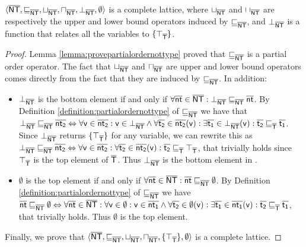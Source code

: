 \documentclass{llncs}
\begin{document}
\begin{lemma}
\label{lemma:nottype}
$\langle \mathsf{\overline{NT}}, \sqsubseteq_{\mathsf{\overline{NT}}}, \sqcup_{\mathsf{\overline{NT}}}, \sqcap_{\mathsf{\overline{NT}}}, \bot_{\mathsf{\overline{NT}}}, \emptyset \rangle$ is a complete lattice, where $\sqcup_{\mathsf{\overline{NT}}}$ and $\sqcap_{\mathsf{\overline{NT}}}$ are respectively the upper and lower bound operators induced by $\sqsubseteq_{\mathsf{\overline{NT}}}$, and $\bot_{\mathsf{\overline{NT}}}$ is a function that relates all the variables to $\{\top_{\mathsf{\overline{T}}}\}$. 

\begin{proof}
Lemma \ref{lemma:provepartialordernottype} proved that $\sqsubseteq_{\mathsf{\overline{NT}}}$ is a partial order operator. The fact that $\sqcup_{\mathsf{\overline{NT}}}$ and $\sqcap_{\mathsf{\overline{NT}}}$ are upper and lower bound operators comes directly from the fact that they are induced by $\sqsubseteq_{\mathsf{\overline{NT}}}$. In addition:
\begin{itemize}
\item $\bot_{\mathsf{\overline{NT}}}$ is the bottom element if and only if $\forall \mathsf{\overline{nt}} \in \mathsf{\overline{NT}} : \bot_{\mathsf{\overline{NT}}} \sqsubseteq_{\mathsf{\overline{NT}}} \mathsf{\overline{nt}}$. By Definition \ref{definition:partialordernottype} of $\sqsubseteq_{\mathsf{\overline{NT}}}$ we have that $
\bot_{\mathsf{\overline{NT}}} \sqsubseteq_{\mathsf{\overline{NT}}} \mathsf{\overline{nt_2}} \Leftrightarrow \forall \mathsf{v} \in \mathsf{\overline{nt_2}} : \mathsf{v} \in \bot_{\mathsf{\overline{NT}}} \land \forall \mathsf{\overline{t_2}} \in \mathsf{\overline{nt_2}}(\mathsf{v}) : \exists \mathsf{\overline{t_1}} \in \bot_{\mathsf{\overline{NT}}}(\mathsf{v}) : \mathsf{\overline{t_2}} \sqsubseteq_{\mathsf{\overline{T}}} \mathsf{\overline{t_1}}$. Since $\bot_{\mathsf{\overline{NT}}}$ returns $\{\top_{\mathsf{\overline{T}}}\}$ for any variable, we can rewrite this as $\bot_{\mathsf{\overline{NT}}} \sqsubseteq_{\mathsf{\overline{NT}}} \mathsf{\overline{nt_2}} \Leftrightarrow \forall \mathsf{v} \in \mathsf{\overline{nt_2}} : \forall \mathsf{\overline{t_2}} \in \mathsf{\overline{nt_2}}(\mathsf{v}) : \mathsf{\overline{t_2}} \sqsubseteq_{\mathsf{\overline{T}}} \top_{\mathsf{\overline{T}}}$, that trivially holds since $\top_{\mathsf{\overline{T}}}$ is the top element of $\mathsf{\overline{T}}$. Thus $\bot_{\mathsf{\overline{NT}}}$ is the bottom element in \nottype.
\item $\emptyset$ is the top element if and only if $\forall \mathsf{\overline{nt}} \in \mathsf{\overline{NT}} : \mathsf{\overline{nt}} \sqsubseteq_{\mathsf{\overline{NT}}} \emptyset$. By Definition \ref{definition:partialordernottype} of $\sqsubseteq_{\mathsf{\overline{NT}}}$ we have $\mathsf{\overline{nt}} \sqsubseteq_{\mathsf{\overline{NT}}} \emptyset \Leftrightarrow \forall \mathsf{\overline{nt}} \in \mathsf{\overline{NT}} : \forall \mathsf{v} \in \emptyset : \mathsf{v} \in \mathsf{\overline{nt_1}} \land \forall \mathsf{\overline{t_2}} \in \emptyset(\mathsf{v}) : \exists \mathsf{\overline{t_1}} \in \mathsf{\overline{nt_1}}(\mathsf{v}) : \mathsf{\overline{t_2}} \sqsubseteq_{\mathsf{\overline{T}}} \mathsf{\overline{t_1}}$, that trivially holds. Thus $\emptyset$ is the top element.


\end{itemize}
Finally, we prove that $\langle \mathsf{\overline{NT}}, \sqsubseteq_{\mathsf{\overline{NT}}}, \sqcup_{\mathsf{\overline{NT}}}, \sqcap_{\mathsf{\overline{NT}}}, \{\top_{\mathsf{\overline{T}}}\}, \emptyset \rangle$ is a complete lattice.
\end{proof}

\end{lemma}
\end{document}
